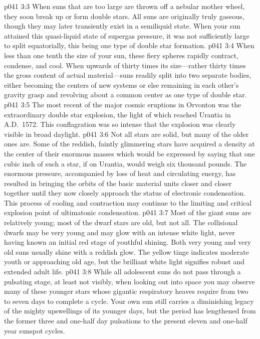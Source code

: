 \pc \vs p041 3:3 When suns that are too large are thrown off a nebular mother wheel, they soon break up or form double stars. All suns are originally truly gaseous, though they may later transiently exist in a semiliquid state. When your sun attained this quasi\hyp{}liquid state of supergas pressure, it was not sufficiently large to split equatorially, this being one type of double star formation.
\vs p041 3:4 When less than one tenth the size of your sun, these fiery spheres rapidly contract, condense, and cool. When upwards of thirty times its size---rather thirty times the gross content of actual material---suns readily split into two separate bodies, either becoming the centers of new systems or else remaining in each other’s gravity grasp and revolving about a common center as one type of double star.
\pc \vs p041 3:5 The most recent of the major cosmic eruptions in Orvonton was the extraordinary double star explosion, the light of which reached Urantia in A.D.~1572. This conflagration was so intense that the explosion was clearly visible in broad daylight.\plusone
\pc \vs p041 3:6 Not all stars are solid, but many of the older ones are. Some of the reddish, faintly glimmering stars have acquired a density at the center of their enormous masses which would be expressed by saying that one cubic inch of such a star, if on Urantia, would weigh six thousand pounds. The enormous pressure, accompanied by loss of heat and circulating energy, has resulted in bringing the orbits of the basic material units closer and closer together until they now closely approach the status of electronic condensation. This process of cooling and contraction may continue to the limiting and critical explosion point of ultimatonic condensation.\plusone
\vs p041 3:7 Most of the giant suns are relatively young; most of the dwarf stars are old, but not all. The collisional dwarfs may be very young and may glow with an intense white light, never having known an initial red stage of youthful shining. Both very young and very old suns usually shine with a reddish glow. The yellow tinge indicates moderate youth or approaching old age, but the brilliant white light signifies robust and extended adult life.
\pc \vs p041 3:8 While all adolescent suns do not pass through a pulsating stage, at least not visibly, when looking out into space you may observe many of these younger stars whose gigantic respiratory heaves require from two to seven days to complete a cycle. Your own sun still carries a diminishing legacy of the mighty upswellings of its younger days, but the period has lengthened from the former three and one\hyp{}half day pulsations to the present eleven and one\hyp{}half year sunspot cycles.
